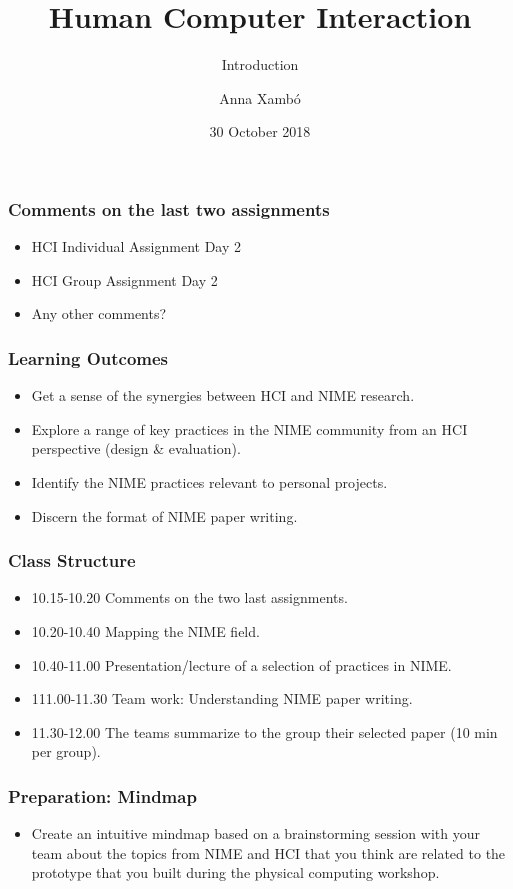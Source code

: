 \documentclass[screen, aspectratio=43]{beamer}
\title[HCI-intro]{Human Computer Interaction}
\subtitle{Introduction}
\author[A. Xamb{\'o}]{Anna Xamb{\'o}}
\institute[NTNU]{Department of Music, NTNU}
\date{30 October 2018}
\begin{document}
\begin{frame}
  \titlepage
\end{frame}

\begin{frame}
\frametitle{Comments on the last two assignments}
\begin{itemize}
\item HCI Individual Assignment Day 2
\item HCI Group Assignment Day 2
\item Any other comments?
\end{itemize}
\end{frame}
%
\begin{frame}
\frametitle{Learning Outcomes}
\begin{itemize}
\item Get a sense of the synergies between HCI and NIME research.
\item Explore a range of key practices in the NIME community from an HCI perspective (design \& evaluation).
\item Identify the NIME practices relevant to personal projects.
\item Discern the format of NIME paper writing.
\end{itemize}
\end{frame}
%
\begin{frame}
\frametitle{Class Structure}
\begin{itemize}
\item 10.15-10.20 Comments on the two last assignments.
\item 10.20-10.40 Mapping the NIME field.
\item 10.40-11.00 Presentation/lecture of a selection of practices in NIME.
\item 111.00-11.30 Team work: Understanding NIME paper writing.
\item 11.30-12.00 The teams summarize to the group their selected paper (10 min per group). 
\end{itemize}
\end{frame}
%
\begin{frame}
\frametitle{Preparation: Mindmap}
\begin{itemize}
\item Create an intuitive mindmap based on a brainstorming session with your team about the topics from NIME and HCI that you think are related to the prototype that you built during the physical computing workshop.
\end{itemize}
\end{frame}
\end{document}
